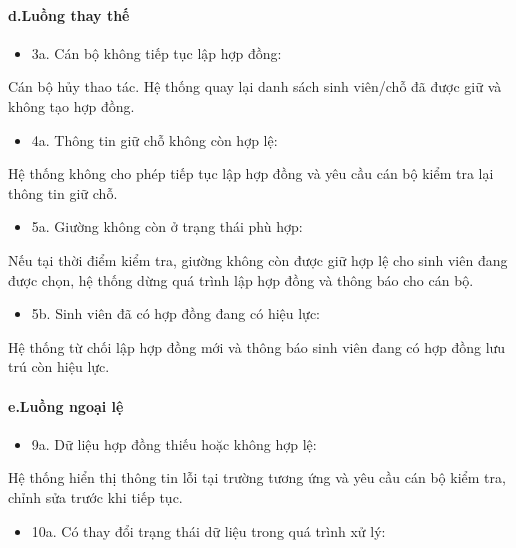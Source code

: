 \paragraph{d.Luồng thay thế}

\begin{itemize}[leftmargin=1.4em]
\item 3a. Cán bộ không tiếp tục lập hợp đồng:
\end{itemize}

Cán bộ hủy thao tác. Hệ thống quay lại danh sách sinh viên/chỗ đã được giữ và không tạo hợp đồng.

\begin{itemize}[leftmargin=1.4em]
\item 4a. Thông tin giữ chỗ không còn hợp lệ:
\end{itemize}

Hệ thống không cho phép tiếp tục lập hợp đồng và yêu cầu cán bộ kiểm tra lại thông tin giữ chỗ.

\begin{itemize}[leftmargin=1.4em]
\item 5a. Giường không còn ở trạng thái phù hợp:
\end{itemize}

Nếu tại thời điểm kiểm tra, giường không còn được giữ hợp lệ cho sinh viên đang được chọn, hệ thống dừng quá trình lập hợp đồng và thông báo cho cán bộ.

\begin{itemize}[leftmargin=1.4em]
\item 5b. Sinh viên đã có hợp đồng đang có hiệu lực:
\end{itemize}

Hệ thống từ chối lập hợp đồng mới và thông báo sinh viên đang có hợp đồng lưu trú còn hiệu lực.

\paragraph{e.Luồng ngoại lệ}

\begin{itemize}[leftmargin=1.4em]
\item 9a. Dữ liệu hợp đồng thiếu hoặc không hợp lệ:
\end{itemize}

Hệ thống hiển thị thông tin lỗi tại trường tương ứng và yêu cầu cán bộ kiểm tra, chỉnh sửa trước khi tiếp tục.

\begin{itemize}[leftmargin=1.4em]
\item 10a. Có thay đổi trạng thái dữ liệu trong quá trình xử lý:
\end{itemize}


